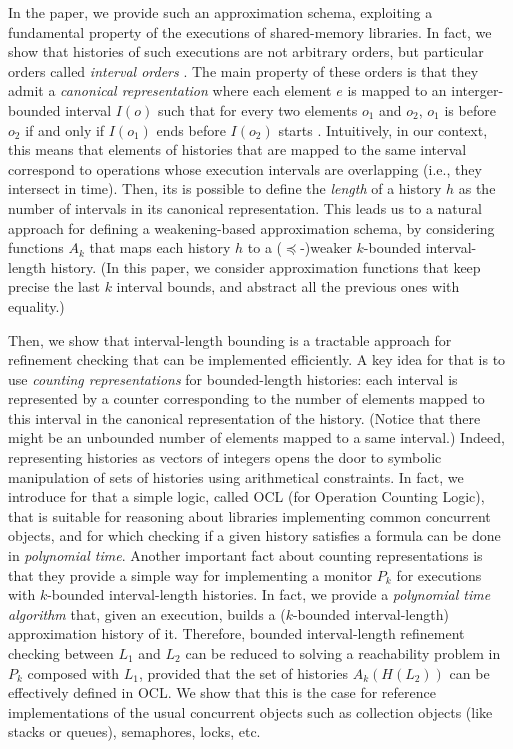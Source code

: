 In the paper, we provide such an approximation schema, exploiting a fundamental property of the executions of shared-memory libraries. In fact, we show that histories of such executions are not arbitrary orders, but particular orders called {\em interval orders} \cite{}. The main property of these orders is that they admit a {\em canonical representation} where each element $e$ is mapped to an interger-bounded interval $I(o)$ such that for every two elements $o_1$ and $o_2$, $o_1$ is before $o_2$ if and only if $I(o_1)$ ends before  $I(o_2)$ starts \cite{}. Intuitively, in our context, this means that elements of histories that are mapped to the same interval correspond to operations whose execution intervals are overlapping (i.e., they intersect in time).  Then, its is possible to define the {\em length} of a history $h$ as the number of intervals in its canonical representation. This leads us to a natural approach for defining a weakening-based approximation schema, by considering functions $A_k$ that maps each history $h$ to a ($\preceq$-)weaker $k$-bounded interval-length history. (In this paper, we consider approximation functions that keep precise the last $k$ interval bounds, and abstract all the previous ones with equality.)

Then, we show that interval-length bounding is a tractable approach for refinement checking that can be implemented efficiently. A key idea for that is to use {\em counting representations} for bounded-length histories: each interval is represented by a counter corresponding to the number of elements mapped to this interval in the canonical representation of the history.
(Notice that there might be an unbounded number of elements mapped to a same interval.)
Indeed, representing histories as vectors of integers opens the door to symbolic manipulation of sets of histories using arithmetical constraints. In fact, we introduce for that a simple logic, called OCL (for Operation Counting Logic), that is suitable for reasoning about libraries implementing common concurrent objects, and for which checking  if a given history satisfies a formula can be done in {\em polynomial time}. Another important fact about counting representations is that they provide a simple way for implementing a monitor $P_k$ for executions with $k$-bounded interval-length histories. In fact, we provide a {\em polynomial time algorithm} that, given an execution, builds a ($k$-bounded interval-length) approximation history of it. Therefore, bounded interval-length refinement checking between $L_1$ and $L_2$ can be reduced to solving a reachability problem in $P_k$ composed with $L_1$, provided that the set of histories $A_k(H(L_2))$ can be effectively defined in OCL. We show that this is the case for reference implementations of the usual concurrent objects such as collection objects (like stacks or queues), semaphores, locks, etc. 

